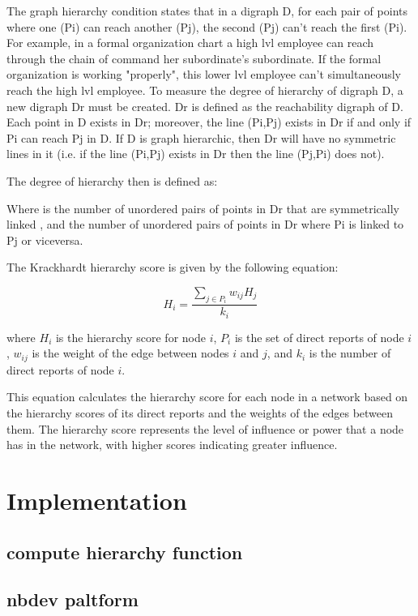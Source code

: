 The graph hierarchy condition states that in a digraph D, for each pair of points where one (Pi) can reach another (Pj), the second (Pj) can't reach the first (Pi). 
For example, in a formal organization chart a high lvl employee can reach through the chain of command her subordinate's subordinate. If the formal organization is working "properly", this lower lvl employee can't simultaneously reach the high lvl employee.
To measure the degree of hierarchy of digraph D, a new digraph Dr must be created. Dr is defined as the reachability digraph of D. Each point in D exists in Dr; moreover, the line (Pi,Pj) exists in Dr if and only if Pi can reach Pj in D. If D is graph hierarchic, then Dr will have no symmetric lines in it (i.e. if the line (Pi,Pj) exists in Dr then the line (Pj,Pi) does not).

The degree of hierarchy then is defined as:

Where is the number of unordered pairs of points in Dr that are symmetrically linked , and the number of unordered pairs of points in Dr where Pi is linked to Pj or viceversa.


The Krackhardt hierarchy score is given by the following equation:

\begin{equation}
H_i = \frac{\sum_{j \in P_i} w_{ij} H_j}{k_i}
\end{equation}

where $H_i$ is the hierarchy score for node $i$, $P_i$ is the set of direct reports of node $i$, $w_{ij}$ is the weight of the edge between nodes $i$ and $j$, and $k_i$ is the number of direct reports of node $i$.

This equation calculates the hierarchy score for each node in a network based on the hierarchy scores of its direct reports and the weights of the edges between them. The hierarchy score represents the level of influence or power that a node has in the network, with higher scores indicating greater influence.


\section{Implementation}

\subsection{compute hierarchy function}

\subsection{nbdev paltform}




